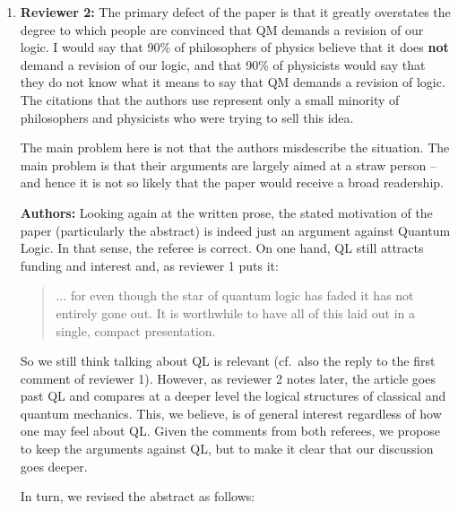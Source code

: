 \documentclass[11pt, executivepaper]{article}
\begin{document}
\begin{enumerate}
\item \textbf{Reviewer 2:} The primary defect of the paper is that it greatly overstates the degree to which people are convinced that QM demands a revision of our logic. I would say that 90\% of philosophers of physics believe that it does \textbf{not} demand a revision of our logic, and that 90\% of physicists would say that they do not know what it means to say that QM demands a revision of logic. The citations that the authors use represent only a small minority of philosophers and physicists who were trying to sell this idea.

The main problem here is not that the authors misdescribe the situation. The main problem is that their arguments are largely aimed at a straw person -- and hence it is not so likely that the paper would receive a broad readership.
\vspace{2mm}

\textbf{Authors:} Looking again at the written prose, the stated motivation of the paper (particularly the abstract) is indeed just an argument against Quantum Logic. In that sense, the referee is correct. On one hand, QL still attracts funding and interest and, as reviewer 1 puts it:
\begin{quote}
... for even though the star of quantum logic has faded it has not entirely gone out. It is worthwhile to have all of this laid out in a single, compact presentation.
\end{quote}
So we still think talking about QL is relevant (cf.\ also the reply to the first comment of reviewer 1). However, as reviewer 2 notes later, the article goes past QL and compares at a deeper level the logical structures of classical and quantum mechanics. This, we believe, is of general interest regardless of how one may feel about QL. Given the comments from both referees, we propose to keep the arguments against QL, but to make it clear that our discussion goes deeper.

In turn, we revised the abstract as follows:


\end{enumerate}
\end{document}
